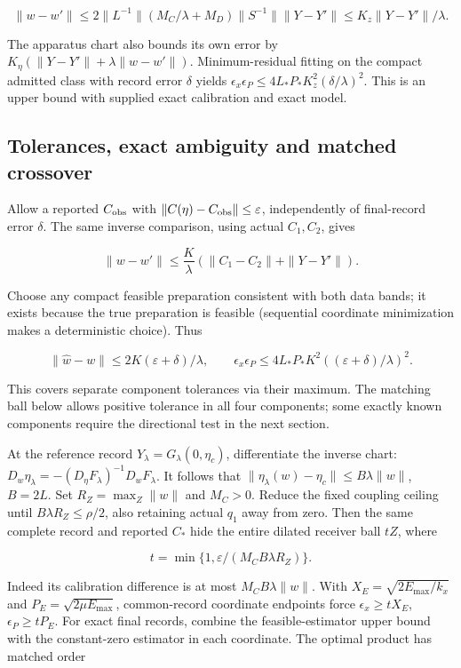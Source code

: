 \documentclass[11pt,a4paper]{article}
\begin{document}
\[\|w-w'\|\le2\|L^{-1}\|(M_C/\lambda+M_D)
 \|S^{-1}\|\|Y-Y'\|\le K_z\|Y-Y'\|/\lambda.\]

The apparatus chart also bounds its own error by
\(K_\eta(\|Y-Y'\|+\lambda\|w-w'\|)\). Minimum-residual fitting on the
compact admitted class with record error \(\delta\) yields
\(\epsilon_x\epsilon_P\le4L_*P_*K_z^2(\delta/\lambda)^2\). This is an
upper bound with supplied exact calibration and exact model.

\hypertarget{tolerances-exact-ambiguity-and-matched-crossover}{%
\subsection{Tolerances, exact ambiguity and matched
crossover}\label{tolerances-exact-ambiguity-and-matched-crossover}}

Allow a reported \(C_{\rm obs}\) with
\(\|C(\eta)-C_{\rm obs}\|\le\varepsilon\), independently of final-record
error \(\delta\). The same inverse comparison, using actual \(C_1,C_2\),
gives

\[\|w-w'\|\le\frac K\lambda
 (\|C_1-C_2\|+\|Y-Y'\|).\]

Choose any compact feasible preparation consistent with both data bands;
it exists because the true preparation is feasible (sequential
coordinate minimization makes a deterministic choice). Thus

\[\|\widehat w-w\|\le2K(\varepsilon+\delta)/\lambda,\qquad
\epsilon_x\epsilon_P\le4L_*P_*K^2
 ((\varepsilon+\delta)/\lambda)^2.\]

This covers separate component tolerances via their maximum. The
matching ball below allows positive tolerance in all four components;
some exactly known components require the directional test in the next
section.

At the reference record \(Y_\lambda=G_\lambda(0,\eta_c)\), differentiate
the inverse chart:
\(D_w\eta_\lambda=-(D_\eta F_\lambda)^{-1}D_wF_\lambda\). It follows
that \(\|\eta_\lambda(w)-\eta_c\|\le B\lambda\|w\|\), \(B=2L\). Set
\(R_Z=\max_Z\|w\|\) and \(M_C>0\). Reduce the fixed coupling ceiling
until \(B\lambda R_Z\le\rho/2\), also retaining actual \(q_1\) away from
zero. Then the same complete record and reported \(C_*\) hide the entire
dilated receiver ball \(tZ\), where

\[t=\min\{1,\varepsilon/(M_CB\lambda R_Z)\}.\]

Indeed its calibration difference is at most \(M_CB\lambda\|w\|\). With
\(X_E=\sqrt{2E_{\max}/k_x}\) and \(P_E=\sqrt{2\mu E_{\max}}\),
common-record coordinate endpoints force \(\epsilon_x\ge tX_E\),
\(\epsilon_P\ge tP_E\). For exact final records, combine the
feasible-estimator upper bound with the constant-zero estimator in each
coordinate. The optimal product has matched order
\end{document}
